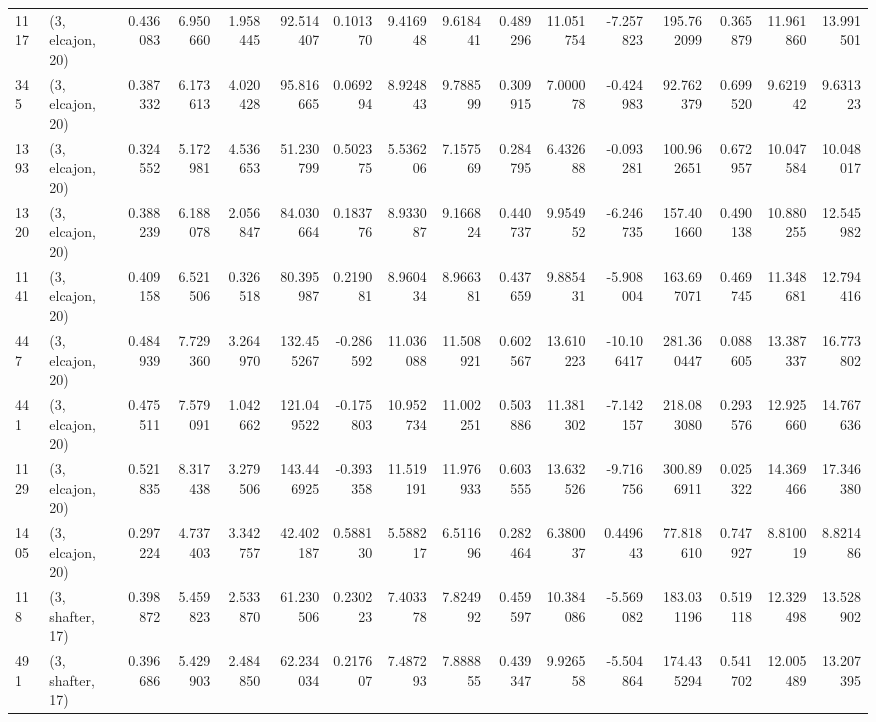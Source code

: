 \begin{tabular}{llrrrrrrrrrrrrrr}
1117 &  (3, elcajon, 20) &   0.436083 &   6.950660 &   1.958445 &     92.514407 &    0.101370 &    9.416948 &    9.618441 &  0.489296 &  11.051754 &  -7.257823 &   195.762099 &   0.365879 &  11.961860 &  13.991501 \\
345  &  (3, elcajon, 20) &   0.387332 &   6.173613 &   4.020428 &     95.816665 &    0.069294 &    8.924843 &    9.788599 &  0.309915 &   7.000078 &  -0.424983 &    92.762379 &   0.699520 &   9.621942 &   9.631323 \\
1393 &  (3, elcajon, 20) &   0.324552 &   5.172981 &   4.536653 &     51.230799 &    0.502375 &    5.536206 &    7.157569 &  0.284795 &   6.432688 &  -0.093281 &   100.962651 &   0.672957 &  10.047584 &  10.048017 \\
1320 &  (3, elcajon, 20) &   0.388239 &   6.188078 &   2.056847 &     84.030664 &    0.183776 &    8.933087 &    9.166824 &  0.440737 &   9.954952 &  -6.246735 &   157.401660 &   0.490138 &  10.880255 &  12.545982 \\
1141 &  (3, elcajon, 20) &   0.409158 &   6.521506 &   0.326518 &     80.395987 &    0.219081 &    8.960434 &    8.966381 &  0.437659 &   9.885431 &  -5.908004 &   163.697071 &   0.469745 &  11.348681 &  12.794416 \\
447  &  (3, elcajon, 20) &   0.484939 &   7.729360 &   3.264970 &    132.455267 &   -0.286592 &   11.036088 &   11.508921 &  0.602567 &  13.610223 & -10.106417 &   281.360447 &   0.088605 &  13.387337 &  16.773802 \\
441  &  (3, elcajon, 20) &   0.475511 &   7.579091 &   1.042662 &    121.049522 &   -0.175803 &   10.952734 &   11.002251 &  0.503886 &  11.381302 &  -7.142157 &   218.083080 &   0.293576 &  12.925660 &  14.767636 \\
1129 &  (3, elcajon, 20) &   0.521835 &   8.317438 &   3.279506 &    143.446925 &   -0.393358 &   11.519191 &   11.976933 &  0.603555 &  13.632526 &  -9.716756 &   300.896911 &   0.025322 &  14.369466 &  17.346380 \\
1405 &  (3, elcajon, 20) &   0.297224 &   4.737403 &   3.342757 &     42.402187 &    0.588130 &    5.588217 &    6.511696 &  0.282464 &   6.380037 &   0.449643 &    77.818610 &   0.747927 &   8.810019 &   8.821486 \\
118  &  (3, shafter, 17) &   0.398872 &   5.459823 &   2.533870 &     61.230506 &    0.230223 &    7.403378 &    7.824992 &  0.459597 &  10.384086 &  -5.569082 &   183.031196 &   0.519118 &  12.329498 &  13.528902 \\
491  &  (3, shafter, 17) &   0.396686 &   5.429903 &   2.484850 &     62.234034 &    0.217607 &    7.487293 &    7.888855 &  0.439347 &   9.926558 &  -5.504864 &   174.435294 &   0.541702 &  12.005489 &  13.207395 \\

\end{tabular}
